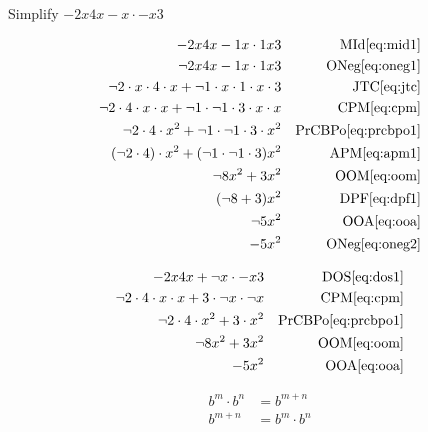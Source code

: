 \begin{example}[id:20141108-194709] \label{20141108-194709}  \hfill \\

Simplify $- 2x4x - x \cdot-x3$

\soln

\solnsteps
\begin{align*}
-2x4x-1x \cdot 1x3 && \text{MId} \eqref{eq:mid1} \\
\neg 2x4x-1x \cdot 1x3  && \text{ONeg} \eqref{eq:oneg1} \\
\neg 2 \cdot x \cdot 4 \cdot x + \neg 1 \cdot x \cdot 1 \cdot x \cdot 3 && \text{JTC} \eqref{eq:jtc} \\
\neg 2 \cdot 4 \cdot x \cdot x + \neg 1 \cdot \neg 1 \cdot 3 \cdot x \cdot x && \text{CPM} \eqref{eq:cpm} \\
\neg 2 \cdot 4 \cdot x^2  + \neg 1 \cdot \neg 1 \cdot 3 \cdot x^2 && \text{PrCBPo} \eqref{eq:prcbpo1} \\
(\neg 2 \cdot 4) \cdot x^2 + (\neg 1 \cdot \neg 1 \cdot 3) x^2 && \text{APM} \eqref{eq:apm1} \\
\neg 8 x^2 + 3 x^2 && \text{OOM} \eqref{eq:oom} \\
(\neg 8 + 3)x^2 && \text{DPF} \eqref{eq:dpf1} \\
\neg 5 x^2 && \text{OOA} \eqref{eq:ooa} \\
-5x^2 && \text{ONeg} \eqref{eq:oneg2} 
\end{align*}

\soln

\lesssteps
\begin{align*}
- 2x4x + \neg x \cdot-x3  && \text{DOS} \eqref{eq:dos1} \\
\neg 2 \cdot 4 \cdot x \cdot x + 3 \cdot \neg x \cdot \neg x && \text{CPM} \eqref{eq:cpm} \\
\neg 2 \cdot 4 \cdot x^2 + 3 \cdot x^2 && \text{PrCBPo} \eqref{eq:prcbpo1} \\
\neg 8x^2 + 3 x^2 && \text{OOM} \eqref{eq:oom} \\
-5x^2 && \text{OOA} \eqref{eq:ooa} 
\end{align*}

\end{example}

\begin{arule}
\begin{subequations}
\begin{align}
	b^m \cdot b^n &= b^{m+n} \label{eq:prcbpo1}\\
	b^{m+n} &= b^m \cdot b^n \label{eq:prcbpo2}
\end{align}
\end{subequations}
\end{arule}

